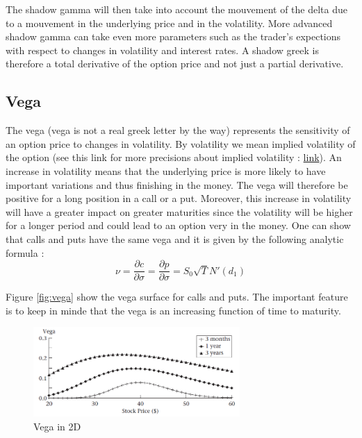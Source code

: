 \documentclass[hidelinks]{article}
\begin{document}
    The shadow gamma will then take into account the mouvement of the delta due to a mouvement in the underlying price and in the volatility. More advanced shadow gamma can take even more parameters such as the trader's expections with respect to changes in volatility and interest rates.
    A shadow greek is therefore a total derivative of the option price and not just a partial derivative.
    \newpage
    \subsection{Vega}
    
    The vega (vega is not a real greek letter by the way) represents the sensitivity of an option price to changes in volatility. By volatility we mean implied volatility of the option (see this link for more precisions about implied volatility : \href{https://www.investopedia.com/terms/i/iv.asp}{link}). An increase in volatility means that the underlying price is more likely to have important variations and thus finishing in the money. The vega will therefore be positive for a long position in a call or a put. Moreover, this increase in volatility will have a greater impact on greater maturities since the volatility will be higher for a longer period and could lead to an option very in the money. One can show that calls and puts have the same vega and it is given by the following analytic formula :
    $$\nu =\frac{\partial c}{\partial \sigma} =\frac{\partial p}{\partial \sigma}= S_0 \sqrt{T} N'(d_1)$$
    
    Figure \ref{fig:vega} show the vega surface for calls and puts. The important feature is to keep in minde that the vega is an increasing function of time to maturity.
    
    \begin{figure}[!h]
	\centering
	
	\includegraphics[width=0.7\textwidth]{vega_2d.png}
	
	\caption{Vega in 2D}
	\label{fig:vega2d}
	\end{figure}
    
\end{document}
